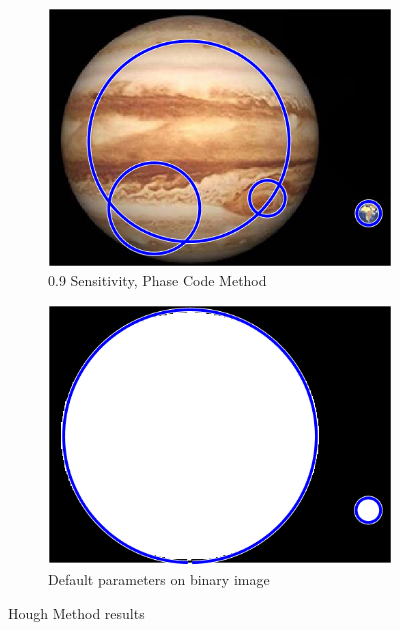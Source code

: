 \begin{figure}[!ht]
\begin{subfigure}{0.49\textwidth}
        \centering
        \includegraphics[width=\textwidth]{Doc/Graphics/Part3/hough_rgb_S09_PhaseCode.png}
        \caption{0.9 Sensitivity, Phase Code Method}
    \end{subfigure} 
    \hfill
    \begin{subfigure}{0.49\textwidth}
        \centering
        \includegraphics[width=\textwidth]{Doc/Graphics/Part3/hough_bw.png}
        \caption{Default parameters on binary image}
    \end{subfigure}    
    \caption{Hough Method results}
    \label{fig:resultsHough}
\end{figure}